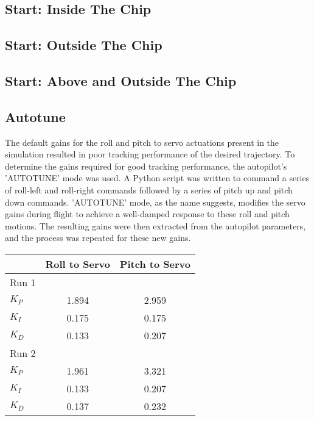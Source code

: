 \documentclass{aiaa}
\begin{document}
\subsection{Start: Inside The Chip}
\subsection{Start: Outside The Chip}
\subsection{Start: Above and Outside The Chip}

\subsection{Autotune}
The default gains for the roll and pitch to servo actuations present in the simulation resulted in poor tracking performance of the desired trajectory. To determine the gains required for good tracking performance, the autopilot's 'AUTOTUNE' mode was used. A Python script was written to command a series of roll-left and roll-right commands followed by a series of pitch up and pitch down commands. 'AUTOTUNE' mode, as the name suggests, modifies the servo gains during flight to achieve a well-damped response to these roll and pitch motions. The resulting gains were then extracted from the autopilot parameters, and the process was repeated for these new gains. 

\begin{center}
\begin{tabular}{ l| c | c}
	&Roll to Servo & Pitch to Servo \\
    
    
    \hline 
    \hline \hline
    Run 1 & & \\
    \hline \hline
    $K_P$ & 1.894 & 2.959 \\
    \hline
    $K_I$ & 0.175 & 0.175 \\
    \hline
    $K_D$ & 0.133 & 0.207 \\
    \hline \hline
    Run 2 & & \\
    \hline \hline
    $K_P$ & 1.961 & 3.321 \\
    \hline
    $K_I$ & 0.133 & 0.207 \\
    \hline
    $K_D$ & 0.137 & 0.232


\end{tabular}
\end{center}
\end{document}
